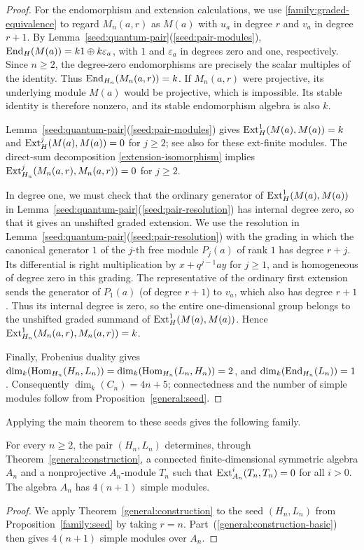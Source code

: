 \documentclass[11pt]{article}
\begin{document}
\begin{proof}
For the endomorphism and extension calculations, we use
\eqref{family:graded-equivalence} to regard $M_n(a,r)$ as $M(a)$ with
$u_a$ in degree $r$ and $v_a$ in degree $r+1$.
By Lemma~\ref{seed:quantum-pair}\textup{(\ref{seed:pair-modules})},
${\rm End}_H(M(a))=k1\oplus k\varepsilon_a$, with $1$ and $\varepsilon_a$ in degrees zero
and one, respectively. Since $n\ge2$, the degree-zero endomorphisms are precisely the
scalar multiples of the identity. Thus ${\rm End}_{H_n}(M_n(a,r))=k$.
If $M_n(a,r)$ were projective, its
underlying module $M(a)$ would be projective, which is impossible.
Its stable identity is therefore nonzero, and its stable
endomorphism algebra is also $k$.

Lemma~\ref{seed:quantum-pair}\textup{(\ref{seed:pair-modules})} gives ${\rm Ext}_H^1(M(a),M(a))=k$ and ${\rm Ext}_H^j(M(a),M(a))=0$ for $j\ge2$; see also \cite[Section~4.1, Corollary~4.3]{Erd} for these ext-finite modules. The direct-sum decomposition \eqref{extension-isomorphism}
implies ${\rm Ext}_{H_n}^j(M_n(a,r),M_n(a,r))=0$ for $j\ge2$.

In degree one, we must check that the ordinary generator of ${\rm Ext}_H^1(M(a), M(a))$ in Lemma~\ref{seed:quantum-pair}\textup{(\ref{seed:pair-resolution})} has internal
degree zero, so that it gives an unshifted graded extension.
We use the resolution in Lemma~\ref{seed:quantum-pair}\textup{(\ref{seed:pair-resolution})}
with the grading in which the canonical generator $1$ of the $j$-th free module $P_j(a)$ of rank $1$ has degree $r+j$. Its differential is right multiplication by $x+q^{j-1}ay$ for $j\ge1$, and is homogeneous of degree zero in this grading. The representative of the ordinary first extension sends the generator of $P_1(a)$ (of degree $r+1$) to $v_a$, which also has degree $r+1$. Thus its internal degree is zero, so the entire one-dimensional group belongs to the unshifted graded summand of ${\rm Ext}_H^1(M(a),M(a))$. Hence
${\rm Ext}_{H_n}^1(M_n(a,r),M_n(a,r))=k$.

Finally, Frobenius duality gives
$\dim_k({\rm Hom}_{H_n}(H_n,L_n))=\dim_k({\rm Hom}_{H_n}(L_n,H_n))=2$, and $\dim_k({\rm End}_{H_n}(L_n))=1$. Consequently $\dim_k(C_n)=4n+5$; connectedness and the number of simple modules follow from
Proposition~\ref{general:seed}.
\end{proof}

Applying the main theorem to these seeds gives the following family.

\begin{Koro}\label{family:outputs}
For every $n\ge2$, the pair $(H_n,L_n)$ determines, through
Theorem~\ref{general:construction}, a connected finite-dimensional
symmetric algebra $A_n$ and a nonprojective $A_n$-module $T_n$
such that
${\rm Ext}_{A_n}^i(T_n,T_n)=0$ for all $i>0$.
The algebra $A_n$ has $4(n+1)$ simple modules.
\end{Koro}
\begin{proof}
We apply Theorem~\ref{general:construction} to the seed $(H_n,L_n)$ from Proposition~\ref{family:seed} by taking $r=n$. Part~\textup{(\ref{general:construction-basic})} then gives $4(n+1)$ simple modules over $A_n$.
\end{proof}
\end{document}
